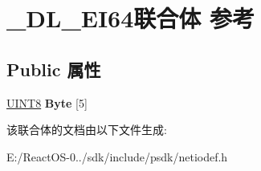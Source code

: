 \hypertarget{union___d_l___e_i64}{}\section{\+\_\+\+D\+L\+\_\+\+E\+I64联合体 参考}
\label{union___d_l___e_i64}
\subsection*{Public 属性}
\begin{DoxyCompactItemize}
\item 
\mbox{\label{union___d_l___e_i64_a7c9214fdfeceadc86c0244b40268ea2e}} 
\hyperlink{_processor_bind_8h_ab27e9918b538ce9d8ca692479b375b6a}{U\+I\+N\+T8} {\bfseries Byte} \mbox{[}5\mbox{]}
\end{DoxyCompactItemize}


该联合体的文档由以下文件生成\+:\begin{DoxyCompactItemize}
\item 
E\+:/\+React\+O\+S-\/0../sdk/include/psdk/netiodef.\+h\end{DoxyCompactItemize}
